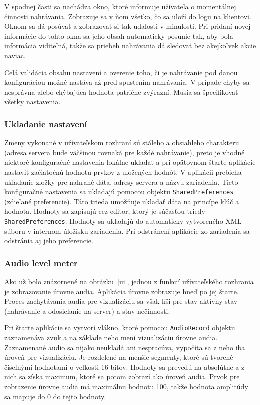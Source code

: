 V spodnej časti sa nachádza okno, ktoré informuje užívateľa o momentálnej činnosti nahrávania. Zobrazuje sa v ňom všetko, čo sa uloží do logu na klientovi. Oknom sa dá posúvať a zobrazovať si tak udalosti v minulosti. Pri pridaní novej informácie do tohto okna sa jeho obsah automaticky posunie tak, aby bola informácia viditeľná, takže sa priebeh nahrávania dá sledovať bez akejkoľvek akcie naviac.

Celá validácia obsahu nastavení a overenie toho, či je nahrávanie pod danou konfiguráciou možné nastáva až pred spustením nahrávania. V prípade chyby sa nesprávna alebo chýbajúca hodnota patrične zvýrazní. Musia sa špecifikovať všetky nastavenia.

\subsubsection{Ukladanie nastavení}

Zmeny vykonané v užívateľskom rozhraní sú stáleho a obsiahleho charakteru (adresa servera bude väčšinou rovnaká pre každé nahrávanie), preto je vhodné niektoré konfiguračné nastavenia lokálne ukladať a pri opätovnom štarte aplikácie nastaviť začiatočnú hodnotu prvkov z uložených hodnôt. V aplikácii prebieha ukladanie zložky pre nahrané dáta, adresy servera a názvu zariadenia. Tieto konfiguračné nastavenia sa ukladajú pomocou objektu \texttt{SharedPreferences} (zdieľané preferencie). Táto trieda umožňuje ukladať dáta na princípe kľúč a hodnota. Hodnoty sa zapisujú cez editor, ktorý je súčasťou triedy \texttt{SharedPreferences}. Hodnoty sa ukladajú do automaticky vytvoreného XML súboru v internom úložisku zariadenia. Pri odstránení aplikácie zo zariadenia sa odstránia aj jeho preferencie.

\subsubsection{Audio level meter}

Ako už bolo znázornené na obrázku~\ref{ui}, jednou z funkcií užívateľského rozhrania je zobrazovanie úrovne audia. Aplikácia úrovne zobrazuje hneď po jej štarte. Proces zachytávania audia pre vizualizáciu sa však líši pre stav aktívny stav (nahrávanie a odosielanie na server) a stav nečinnosti.

Pri štarte aplikácie sa vytvorí vlákno, ktoré pomocou \texttt{AudioRecord} objektu zaznamenáva zvuk a na základe neho mení vizualizáciu úrovne audia. Zaznamenané audio sa nijako neukladá ani nespracúva, vypočíta sa z neho iba úroveň pre vizualizáciu. Je rozdelené na menšie segmenty, ktoré sú tvorené číselnými hodnotami o veľkosti 16 bitov. Hodnoty sa prevedú na absolútne a z nich sa získa maximum, ktoré sa potom zobrazí ako úroveň audia. Prvok pre zobrazenie úrovne audia má maximálnu hodnotu 100, takže hodnota amplitúdy sa mapuje do 0 do tejto hodnoty.

